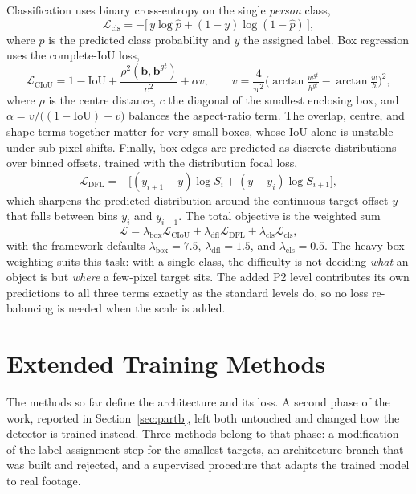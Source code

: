 \documentclass[12pt,a4paper,oneside]{report}
\begin{document}
Classification uses binary cross-entropy on the single \emph{person} class,
\begin{equation}
  \mathcal{L}_{\mathrm{cls}} = -\big[\, y \log \hat{p} + (1-y)\log(1-\hat{p}) \,\big],
\end{equation}
where $\hat{p}$ is the predicted class probability and $y$ the
assigned label. Box regression uses the complete-IoU loss,
\begin{equation}
  \mathcal{L}_{\mathrm{CIoU}} = 1 - \mathrm{IoU}
      + \frac{\rho^2(\mathbf{b}, \mathbf{b}^{gt})}{c^2} + \alpha v,
  \qquad
  v = \frac{4}{\pi^2}\Big(\arctan\tfrac{w^{gt}}{h^{gt}} - \arctan\tfrac{w}{h}\Big)^{\!2},
\end{equation}
where $\rho$ is the centre distance, $c$ the diagonal of the smallest enclosing
box, and $\alpha = v / \big((1-\mathrm{IoU}) + v\big)$ balances the aspect-ratio
term. The overlap, centre, and shape terms together matter for very small boxes,
whose IoU alone is unstable under sub-pixel shifts. Finally, box edges are
predicted as discrete distributions over binned offsets, trained with the
distribution focal loss,
\begin{equation}
  \mathcal{L}_{\mathrm{DFL}} = -\big[(y_{i+1}-y)\log S_i + (y-y_i)\log S_{i+1}\big],
\end{equation}
which sharpens the predicted distribution around the continuous target offset
$y$ that falls between bins $y_i$ and $y_{i+1}$. The total objective is the
weighted sum
\begin{equation}
  \mathcal{L} = \lambda_{\mathrm{box}} \mathcal{L}_{\mathrm{CIoU}}
              + \lambda_{\mathrm{dfl}} \mathcal{L}_{\mathrm{DFL}}
              + \lambda_{\mathrm{cls}} \mathcal{L}_{\mathrm{cls}},
\end{equation}
with the framework defaults $\lambda_{\mathrm{box}} = 7.5$,
$\lambda_{\mathrm{dfl}} = 1.5$, and $\lambda_{\mathrm{cls}} = 0.5$. The heavy
box weighting suits this task: with a single class, the difficulty is not
deciding \emph{what} an object is but \emph{where} a few-pixel target sits. The
added P2 level contributes its own predictions to all three terms exactly as
the standard levels do, so no loss re-balancing is needed when the scale is
added.

\section{Extended Training Methods}
The methods so far define the architecture and its loss. A second phase of the
work, reported in Section~\ref{sec:partb}, left both untouched and changed how
the detector is trained instead. Three methods belong to that phase: a
modification of the label-assignment step for the smallest targets, an
architecture branch that was built and rejected, and a supervised procedure
that adapts the trained model to real footage.
\end{document}
